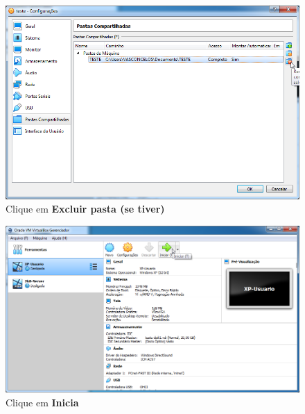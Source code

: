 \documentclass[10pt]{article}
\begin{document}
\begin{figure}[H]
    \centering
    \caption{Clique em \textbf{Excluir pasta (se tiver)}}
    \label{fig:3112}
    \includegraphics[width=\linewidth]{images/ativacao_das_maquinas_virtuais/configuracao_inicial_das_maquinas_virtuais/012.png}
\end{figure}
\begin{figure}[H]
    \centering
    \caption{Clique em \textbf{Inicia}}
    \label{fig:3114}
    \includegraphics[width=\linewidth]{images/ativacao_das_maquinas_virtuais/configuracao_inicial_das_maquinas_virtuais/014.png}
\end{figure}
\end{document}
